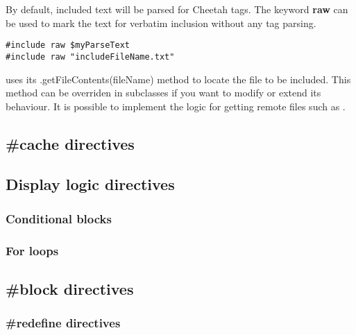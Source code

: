 By default, included text will be parsed for Cheetah tags.  The keyword
{\bf raw} can be used to mark the text for verbatim inclusion without any tag
parsing.

\begin{verbatim}
#include raw $myParseText
#include raw "includeFileName.txt"
\end{verbatim}

 uses its .getFileContents(fileName) method to locate the file to
be included.  This method can be overriden in subclasses if you want to modify
or extend its behaviour.  It is possible to implement the logic for getting 
remote files such as .


\subsection{\#cache directives}


\subsection{Display logic directives}

\subsubsection{Conditional blocks}

\subsubsection{For loops}

\subsection{\#block directives}

\subsubsection{\#redefine directives}


